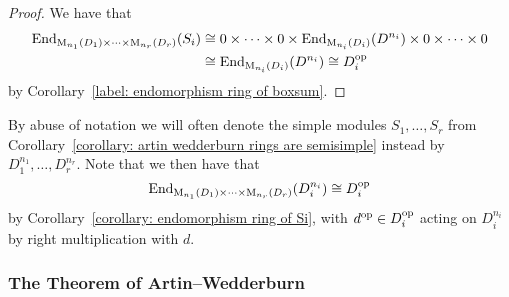 \begin{proof}
  We have that
  \begin{align*}
            \operatorname{End}_{\operatorname{M}_{n_1}(D_1) \times \dotsb \times \operatorname{M}_{n_r}(D_r)}(S_i)
    &\cong  0 \times \dotsb \times 0 \times \operatorname{End}_{\operatorname{M}_{n_i}(D_i)}(D^{n_i}) \times 0 \times \dotsb \times 0 \\
    &\cong  \operatorname{End}_{\operatorname{M}_{n_i}(D_i)}(D^{n_i})
     \cong  D_i^{\operatorname{op}}
  \end{align*}
  by Corollary~\ref{label: endomorphism ring of boxsum}.
\end{proof}



\begin{notation}
  \label{notation: simple modules over products of matrix rings}
  By abuse of notation we will often denote the simple modules $S_1, \dotsc, S_r$ from Corollary~\ref{corollary: artin wedderburn rings are semisimple} instead by $D_1^{n_1}, \dotsc, D_r^{n_r}$.
  Note that we then have that
  \[
          \operatorname{End}_{\operatorname{M}_{n_1}(D_1) \times \dotsb \times \operatorname{M}_{n_r}(D_r)}(D_i^{n_i})
    \cong D_i^{\operatorname{op}}
  \]
  by Corollary~\ref{corollary: endomorphism ring of Si}, with $d^{\operatorname{op}} \in D_i^{\operatorname{op}}$ acting on $D_i^{n_i}$ by right multiplication with $d$.
\end{notation}







\subsubsection{The Theorem of Artin--Wedderburn}






